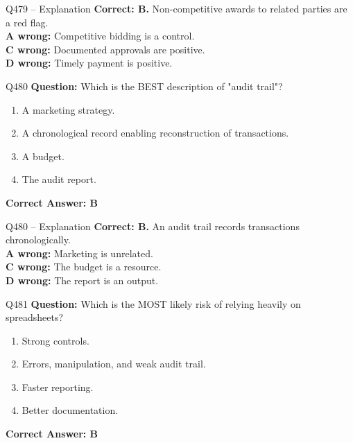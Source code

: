 \documentclass[aspectratio=169,10pt]{beamer}
\begin{document}
	\begin{frame}[t]{Q479 -- Explanation}
		\small
		\textbf{Correct: B.} Non-competitive awards to related parties are a red flag. \\[4pt]
		\textbf{A wrong:} Competitive bidding is a control. \\[2pt]
		\textbf{C wrong:} Documented approvals are positive. \\[2pt]
		\textbf{D wrong:} Timely payment is positive.
	\end{frame}
	
	\begin{frame}[t]{Q480}
		\small
		\textbf{Question:} Which is the BEST description of "audit trail"?
		\begin{enumerate}[label=\Alph*.,itemsep=1pt,topsep=2pt]
			\item A marketing strategy.
			\item A chronological record enabling reconstruction of transactions.
			\item A budget.
			\item The audit report.
		\end{enumerate}
		\vspace{4pt}
		\textbf{Correct Answer: B}
	\end{frame}
	
	\begin{frame}[t]{Q480 -- Explanation}
		\small
		\textbf{Correct: B.} An audit trail records transactions chronologically. \\[4pt]
		\textbf{A wrong:} Marketing is unrelated. \\[2pt]
		\textbf{C wrong:} The budget is a resource. \\[2pt]
		\textbf{D wrong:} The report is an output.
	\end{frame}
	
	\begin{frame}[t]{Q481}
		\small
		\textbf{Question:} Which is the MOST likely risk of relying heavily on spreadsheets?
		\begin{enumerate}[label=\Alph*.,itemsep=1pt,topsep=2pt]
			\item Strong controls.
			\item Errors, manipulation, and weak audit trail.
			\item Faster reporting.
			\item Better documentation.
		\end{enumerate}
		\vspace{4pt}
		\textbf{Correct Answer: B}
	\end{frame}
	
\end{document}
